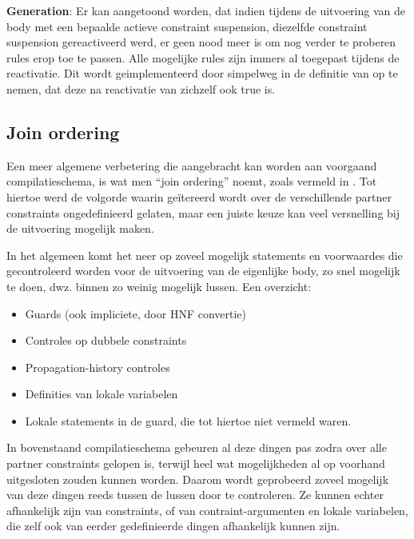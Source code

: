 {\bf Generation}: Er kan aangetoond worden, dat indien tijdens de uitvoering van de body met een bepaalde actieve constraint suspension, diezelfde constraint suspension gereactiveerd werd, er geen nood meer is om nog verder te proberen rules erop toe te passen. Alle mogelijke rules zijn immers al toegepast tijdens de reactivatie. Dit wordt geimplementeerd door simpelweg in de definitie van  op te nemen, dat deze na reactivatie van zichzelf ook true is.

\subsection{Join ordering} \label{sec:joinorder}


Een meer algemene verbetering die aangebracht kan worden aan voorgaand compilatieschema, is wat men ``join ordering'' noemt, zoals vermeld in \cite{duck:optimizing}. Tot hiertoe werd de volgorde waarin ge\"itereerd wordt over de verschillende partner constraints ongedefinieerd gelaten, maar een juiste keuze kan veel versnelling bij de uitvoering mogelijk maken.

In het algemeen komt het neer op zoveel mogelijk statements en voorwaardes die gecontroleerd worden voor de uitvoering van de eigenlijke body, zo snel mogelijk te doen, dwz. binnen zo weinig mogelijk lussen. Een overzicht: \begin{itemize}
  \item Guards (ook impliciete, door HNF convertie)
  \item Controles op dubbele constraints
  \item Propagation-history controles
  \item Definities van lokale variabelen
  \item Lokale statements in de guard, die tot hiertoe niet vermeld waren.
\end{itemize}
In bovenstaand compilatieschema gebeuren al deze dingen pas zodra over alle partner constraints gelopen is, terwijl heel wat mogelijkheden al op voorhand uitgesloten zouden kunnen worden. Daarom wordt geprobeerd zoveel mogelijk van deze dingen reeds tussen de lussen door te controleren. Ze kunnen echter afhankelijk zijn van constraints, of van contraint-argumenten en lokale variabelen, die zelf ook van eerder gedefinieerde dingen afhankelijk kunnen zijn.

